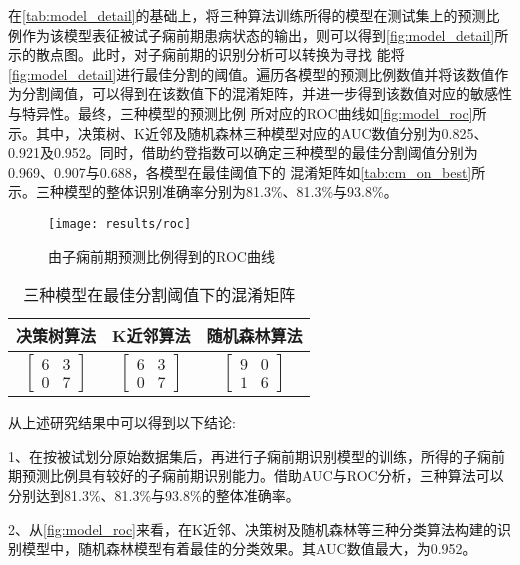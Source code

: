 在\autoref{tab:model_detail}的基础上，将三种算法训练所得的模型在测试集上的预测比例作为该模型表征被试子痫前期患病状态的输出，则可以得到\autoref{fig:model_detail}所示的散点图。此时，对子痫前期的识别分析可以转换为寻找
能将\autoref{fig:model_detail}进行最佳分割的阈值。遍历各模型的预测比例数值并将该数值作为分割阈值，可以得到在该数值下的混淆矩阵，并进一步得到该数值对应的敏感性与特异性。最终，三种模型的预测比例
所对应的ROC曲线如\autoref{fig:model_roc}所示。其中，决策树、K近邻及随机森林三种模型对应的AUC数值分别为0.825、0.921及0.952。同时，借助约登指数可以确定三种模型的最佳分割阈值分别为0.969、0.907与0.688，各模型在最佳阈值下的
混淆矩阵如\autoref{tab:cm_on_best}所示。三种模型的整体识别准确率分别为81.3\%、81.3\%与93.8\%。

\begin{figure}[htbp]
      \centering
      \texttt{[image: results/roc]}
      \caption[由子痫前期预测比例得到的ROC曲线]{\label{fig:model_roc}由子痫前期预测比例得到的ROC曲线}
\end{figure}
\begin{table}[htbp]
      \centering
      \caption{\label{tab:cm_on_best}三种模型在最佳分割阈值下的混淆矩阵}
      \begin{tabular}{ccc}
      \toprule
      \textbf{决策树算法}&\textbf{K近邻算法}&\textbf{随机森林算法}\\
      \midrule
      $\left[ \begin{array}{cc} 6 & 3 \\ 0 & 7 \end{array} \right]$ & $\left[ \begin{array}{cc} 6 & 3 \\ 0 & 7 \end{array} \right]$ & $\left[ \begin{array}{cc} 9 & 0 \\ 1 & 6 \end{array} \right]$ \\
      \bottomrule
      \end{tabular}%
\end{table}%

从上述研究结果中可以得到以下结论:

1、在按被试划分原始数据集后，再进行子痫前期识别模型的训练，所得的子痫前期预测比例具有较好的子痫前期识别能力。借助AUC与ROC分析，三种算法可以分别达到81.3\%、81.3\%与93.8\%的整体准确率。

2、从\autoref{fig:model_roc}来看，在K近邻、决策树及随机森林等三种分类算法构建的识别模型中，随机森林模型有着最佳的分类效果。其AUC数值最大，为0.952。

